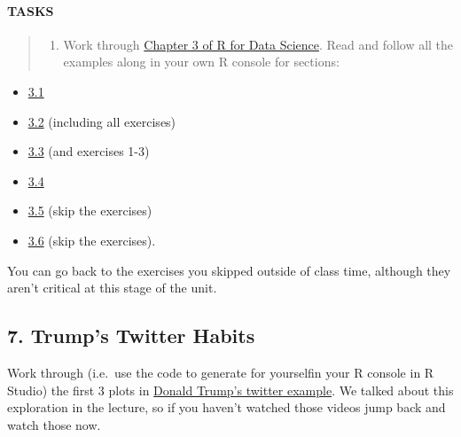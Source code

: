 \documentclass[]{article}
\providecommand{\tightlist}{%
  \setlength{\itemsep}{0pt}\setlength{\parskip}{0pt}}
\let\oldparagraph\paragraph
\renewcommand{\paragraph}[1]{\oldparagraph{#1}\mbox{}}
\begin{document}
\hypertarget{tasks}{%
\paragraph{TASKS}\label{tasks}}

\begin{quote}
\begin{enumerate}
\def\labelenumi{\arabic{enumi}.}
\setcounter{enumi}{5}
\tightlist
\item
  Work through
  \href{https://r4ds.had.co.nz/data-visualisation.html}{Chapter 3 of R
  for Data Science}. Read and follow all the examples along in your own
  R console for sections:
\end{enumerate}
\end{quote}

\begin{itemize}
\tightlist
\item
  \href{https://r4ds.had.co.nz/data-visualisation.html\#introduction-1}{3.1}
\item
  \href{https://r4ds.had.co.nz/data-visualisation.html\#first-steps}{3.2}
  (including all exercises)
\item
  \href{https://r4ds.had.co.nz/data-visualisation.html\#aesthetic-mappings}{3.3}
  (and exercises 1-3)
\item
  \href{https://r4ds.had.co.nz/data-visualisation.html\#common-problems}{3.4}
\item
  \href{https://r4ds.had.co.nz/data-visualisation.html\#facets}{3.5}
  (skip the exercises)
\item
  \href{https://r4ds.had.co.nz/data-visualisation.html\#geometric-objects}{3.6}
  (skip the exercises).
\end{itemize}

You can go back to the exercises you skipped outside of class time,
although they aren't critical at this stage of the unit.

\hypertarget{trumps-twitter-habits}{%
\subsection{7. Trump's Twitter Habits}\label{trumps-twitter-habits}}

Work through (i.e.~use the code to generate for yourselfin your R
console in R Studio) the first 3 plots in
\href{http://varianceexplained.org/r/trump-tweets/}{Donald Trump's
twitter example}. We talked about this exploration in the lecture, so if
you haven't watched those videos jump back and watch those now.
\end{document}
